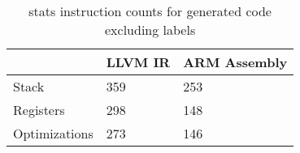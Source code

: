 \begin{table}[h!]
\centering
\begin{tabular}{p{}p{}p{}}
  \hline
 & LLVM IR & ARM Assembly \\ 
  \hline
Stack & 359 & 253 \\ 
  Registers & 298 & 148 \\ 
  Optimizations & 273 & 146 \\ 
   \hline
\end{tabular}
\caption{stats instruction counts for generated code excluding labels}
\end{table}
